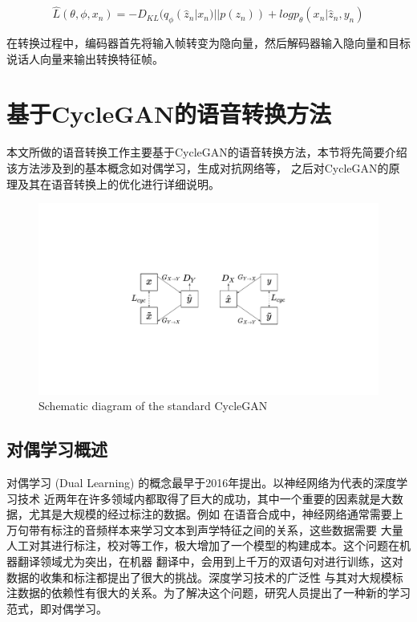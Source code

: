 \begin{equation}
    \hat{L}(\theta,\phi,x_n)=-D_{KL}(q_{\phi}(\hat{z}_n|x_n)||p(z_n))+logp_{\theta}(x_n|\hat{z}_n,y_n)
\end{equation}

在转换过程中，编码器首先将输入帧转变为隐向量，然后解码器输入隐向量和目标说话人向量来输出转换特征帧。


\section{基于CycleGAN的语音转换方法}
本文所做的语音转换工作主要基于CycleGAN的语音转换方法，本节将先简要介绍该方法涉及到的基本概念如对偶学习，生成对抗网络等，
之后对CycleGAN的原理及其在语音转换上的优化进行详细说明。

\begin{figure}[!htp]
    \centering
    \includegraphics[width=13cm,trim=100 140 100 140,clip]{figure/3_cyclegan.pdf}
    {Schematic diagram of the standard CycleGAN}
    \label{fig:cyclegan}
\end{figure}

\subsection{对偶学习概述}
对偶学习 (Dual Learning) 的概念最早于2016年提出\cite{he2016dual}。以神经网络为代表的深度学习技术
近两年在许多领域内都取得了巨大的成功，其中一个重要的因素就是大数据，尤其是大规模的经过标注的数据。例如
在语音合成中，神经网络通常需要上万句带有标注的音频样本来学习文本到声学特征之间的关系，这些数据需要
大量人工对其进行标注，校对等工作，极大增加了一个模型的构建成本。这个问题在机器翻译领域尤为突出，在机器
翻译中，会用到上千万的双语句对进行训练，这对数据的收集和标注都提出了很大的挑战。深度学习技术的广泛性
与其对大规模标注数据的依赖性有很大的关系。为了解决这个问题，研究人员提出了一种新的学习范式，即对偶学习。

